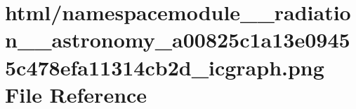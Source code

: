 \hypertarget{namespacemodule____radiation____astronomy__a00825c1a13e09455c478efa11314cb2d__icgraph_8png}{}\section{html/namespacemodule\+\_\+\+\_\+radiation\+\_\+\+\_\+astronomy\+\_\+a00825c1a13e09455c478efa11314cb2d\+\_\+icgraph.png File Reference}
\label{namespacemodule____radiation____astronomy__a00825c1a13e09455c478efa11314cb2d__icgraph_8png}
